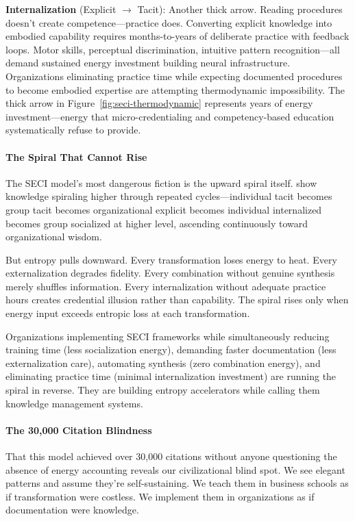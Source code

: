 \textbf{Internalization} (Explicit $\rightarrow$ Tacit): Another thick arrow. Reading procedures doesn't create competence---practice does. Converting explicit knowledge into embodied capability requires months-to-years of deliberate practice with feedback loops. Motor skills, perceptual discrimination, intuitive pattern recognition---all demand sustained energy investment building neural infrastructure. Organizations eliminating practice time while expecting documented procedures to become embodied expertise are attempting thermodynamic impossibility. The thick arrow in Figure~\ref{fig:seci-thermodynamic} represents years of energy investment---energy that micro-credentialing and competency-based education systematically refuse to provide.

\paragraph{The Spiral That Cannot Rise}

The SECI model's most dangerous fiction is the upward spiral itself. \citeauthor{nonaka1995knowledge} show knowledge spiraling higher through repeated cycles---individual tacit becomes group tacit becomes organizational explicit becomes individual internalized becomes group socialized at higher level, ascending continuously toward organizational wisdom.

But entropy pulls downward. Every transformation loses energy to heat. Every externalization degrades fidelity. Every combination without genuine synthesis merely shuffles information. Every internalization without adequate practice hours creates credential illusion rather than capability. The spiral rises only when energy input exceeds entropic loss at each transformation.

Organizations implementing SECI frameworks while simultaneously reducing training time (less socialization energy), demanding faster documentation (less externalization care), automating synthesis (zero combination energy), and eliminating practice time (minimal internalization investment) are running the spiral in reverse. They are building entropy accelerators while calling them knowledge management systems.

\paragraph{The 30,000 Citation Blindness}

That this model achieved over 30,000 citations without anyone questioning the absence of energy accounting reveals our civilizational blind spot. We see elegant patterns and assume they're self-sustaining. We teach them in business schools as if transformation were costless. We implement them in organizations as if documentation were knowledge.

